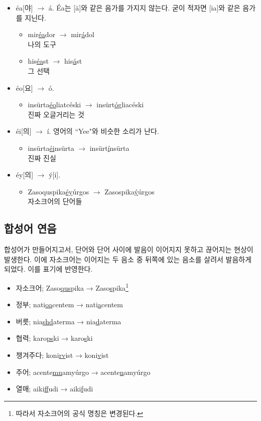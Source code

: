 \documentclass{article}
\begin{document}
\begin{itemize}
	\item éa[야] $\rightarrow$ á. Éa는 [ä]와 같은 음가를 가지지 않는다. 굳이 적자면 [ia]와 같은 음가를 지닌다.
		\begin{itemize}
			\item mir\underline{éa}dor $\rightarrow$ mir\underline{á}dol \\ 나의 도구
			\item his\underline{éa}st $\rightarrow$ his\underline{á}st \\ 그 선택
		\end{itemize}
	\item éo[요] $\rightarrow$ ó.
		\begin{itemize}
			\item insürta\underline{éo}liatcéski $\rightarrow$ insürt\underline{ó}gliacéski \\ 진짜 오글거리는 것
		\end{itemize}
	\item éi[의] $\rightarrow$ í. 영어의 ``Yee"와 비슷한 소리가 난다.
		\begin{itemize}
			\item insürta\underline{éi}nsürta $\rightarrow$ insürt\underline{í}nsürta \\ 진짜 진실
		\end{itemize}
	\item éy[의] $\rightarrow$ ý[i].
		\begin{itemize}
			\item Zasoquspika\underline{éy}úrgos $\rightarrow$ Zasospika\underline{ý}úrgos \\ 자소크어의 단어들
		\end{itemize}
\end{itemize}

\subsection{합성어 연음}

합성어가 만들어지고서, 단어와 단어 사이에 발음이 이어지지 못하고 끊어지는 현상이 발생한다. 이에 자소크어는 이어지는 두 음소 중 뒤쪽에 있는 음소를 살려서 발음하게 되었다. 이를 표기에 반영한다.

\begin{itemize}
	\item 자소크어; Zaso\underline{qus}pika → Zaso\underline{s}pika\footnote{따라서 자소크어의 공식 명칭은 변경된다.}
	\item 정부; nati\underline{oa}centem → nati\underline{a}centem
	\item 버릇; nia\underline{shd}aterma → nia\underline{d}aterma
	\item 협력; karo\underline{ps}ki → karo\underline{s}ki
	\item 챙겨주다; koni\underline{rv}ist → koni\underline{v}ist
	\item 주어; acente\underline{mn}amyúrgo → acente\underline{n}amyúrgo
	\item 열매; aiki\underline{ff}udi → aiki\underline{f}udi
\end{itemize}
\end{document}
